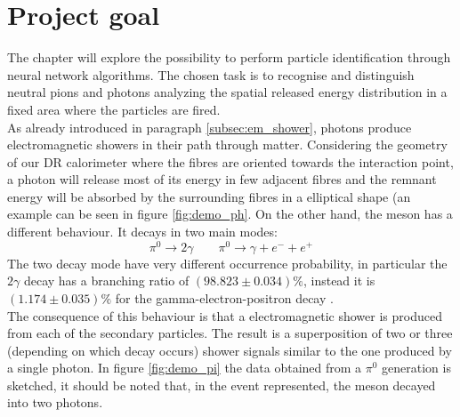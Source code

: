 \section{Project goal}
The chapter will explore the possibility to perform particle identification through neural network algorithms. The chosen task is to recognise and distinguish neutral pions and photons analyzing the spatial released energy distribution in a fixed area where the particles are fired.\\
As already introduced in paragraph \ref{subsec:em_shower}, photons produce electromagnetic showers in their path through matter. Considering the geometry of our DR calorimeter where the fibres are oriented towards the interaction point, a photon will release most of its energy in few adjacent fibres and the remnant energy will be absorbed by the surrounding fibres in a elliptical shape (an example can be seen in figure \ref{fig:demo_ph}.
On the other hand, the meson has a different behaviour. It decays in two main modes:
\begin{equation}
    \pi^0\xrightarrow{} 2\gamma \qquad \pi^0\xrightarrow{} \gamma + e^- + e^+
\end{equation}
The two decay mode have very different occurrence probability, in particular the $2\gamma$ decay has a branching ratio of $(98.823\pm0.034)\%$, instead it is $(1.174\pm0.035)\%$ for the gamma-electron-positron decay \cite{pi_decay}.\\
The consequence of this behaviour is that a electromagnetic shower is produced from each of the secondary particles. The result is a superposition of two or three (depending on which decay occurs) shower signals similar to the one produced by a single photon. In figure \ref{fig:demo_pi} the data obtained from a $\pi^0$ generation is sketched, it should be noted that, in the event represented, the meson decayed into two photons.\\

